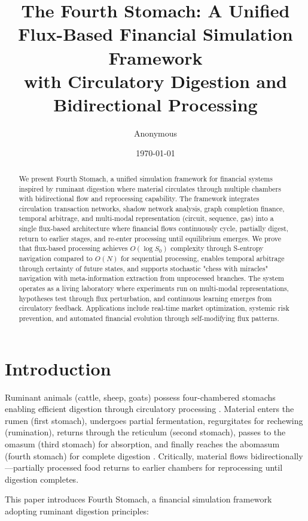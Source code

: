 \documentclass[12pt]{article}
\title{The Fourth Stomach: A Unified Flux-Based Financial Simulation Framework\\ with Circulatory Digestion and Bidirectional Processing}
\author{Anonymous}
\date{\today}
\begin{document}
\maketitle

\begin{abstract}
We present Fourth Stomach, a unified simulation framework for financial systems inspired by ruminant digestion where material circulates through multiple chambers with bidirectional flow and reprocessing capability. The framework integrates circulation transaction networks, shadow network analysis, graph completion finance, temporal arbitrage, and multi-modal representation (circuit, sequence, gas) into a single flux-based architecture where financial flows continuously cycle, partially digest, return to earlier stages, and re-enter processing until equilibrium emerges. We prove that flux-based processing achieves $O(\log S_0)$ complexity through S-entropy navigation compared to $O(N)$ for sequential processing, enables temporal arbitrage through certainty of future states, and supports stochastic "chess with miracles" navigation with meta-information extraction from unprocessed branches. The system operates as a living laboratory where experiments run on multi-modal representations, hypotheses test through flux perturbation, and continuous learning emerges from circulatory feedback. Applications include real-time market optimization, systemic risk prevention, and automated financial evolution through self-modifying flux patterns.
\end{abstract}

\section{Introduction}

Ruminant animals (cattle, sheep, goats) possess four-chambered stomachs enabling efficient digestion through circulatory processing \cite{hofmann1989evolutionary}. Material enters the rumen (first stomach), undergoes partial fermentation, regurgitates for rechewing (rumination), returns through the reticulum (second stomach), passes to the omasum (third stomach) for absorption, and finally reaches the abomasum (fourth stomach) for complete digestion \cite{church1988digestive}. Critically, material flows bidirectionally—partially processed food returns to earlier chambers for reprocessing until digestion completes.

This paper introduces Fourth Stomach, a financial simulation framework adopting ruminant digestion principles:
\end{document}
